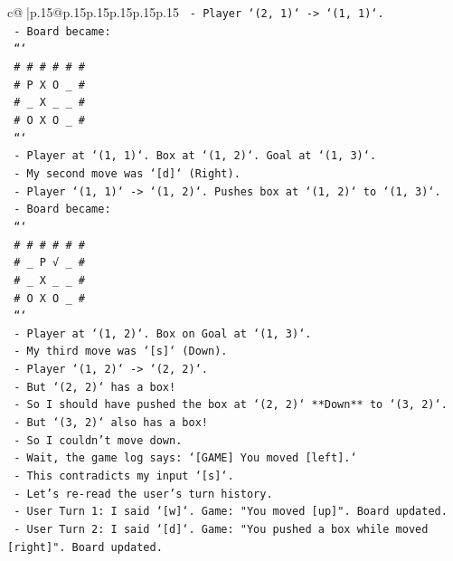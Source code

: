 \documentclass{article}
\begin{document}
{\begin{supertabular}{c@{$\;$}|p{.15\linewidth}@{}p{.15\linewidth}p{.15\linewidth}p{.15\linewidth}p{.15\linewidth}p{.15\linewidth}}
{{{\texttt{    {-} Player `(2, 1)` {-}> `(1, 1)`.} \\
\texttt{    {-} Board became:} \\
\texttt{      ```} \\
\texttt{      \# \# \# \# \# \#} \\
\texttt{      \# P X O \_ \#} \\
\texttt{      \# \_ X \_ \_ \#} \\
\texttt{      \# O X O \_ \#} \\
\texttt{      ```} \\
\texttt{      {-} Player at `(1, 1)`. Box at `(1, 2)`. Goal at `(1, 3)`.} \\
\texttt{  {-} My second move was `{[}d{]}` (Right).} \\
\texttt{    {-} Player `(1, 1)` {-}> `(1, 2)`. Pushes box at `(1, 2)` to `(1, 3)`.} \\
\texttt{    {-} Board became:} \\
\texttt{      ```} \\
\texttt{      \# \# \# \# \# \#} \\
\texttt{      \# \_ P √ \_ \#} \\
\texttt{      \# \_ X \_ \_ \#} \\
\texttt{      \# O X O \_ \#} \\
\texttt{      ```} \\
\texttt{      {-} Player at `(1, 2)`. Box on Goal at `(1, 3)`.} \\
\texttt{  {-} My third move was `{[}s{]}` (Down).} \\
\texttt{    {-} Player `(1, 2)` {-}> `(2, 2)`.} \\
\texttt{    {-} But `(2, 2)` has a box!} \\
\texttt{    {-} So I should have pushed the box at `(2, 2)` **Down** to `(3, 2)`.} \\
\texttt{    {-} But `(3, 2)` also has a box!} \\
\texttt{    {-} So I couldn't move down.} \\
\texttt{    {-} Wait, the game log says: `{[}GAME{]} You moved {[}left{]}.`} \\
\texttt{    {-} This contradicts my input `{[}s{]}`.} \\
\texttt{    {-} Let's re{-}read the user's turn history.} \\
\texttt{    {-} User Turn 1: I said `{[}w{]}`. Game: "You moved {[}up{]}". Board updated.} \\
\texttt{    {-} User Turn 2: I said `{[}d{]}`. Game: "You pushed a box while moved {[}right{]}". Board updated.} \\
}}}
\end{supertabular}}
\end{document}
